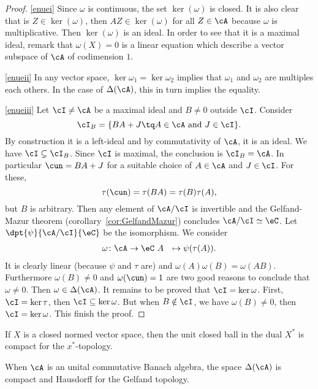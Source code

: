 \begin{proof}
	\ref{enuei} Since $\omega$ is continuous, the set $\ker(\omega)$ is closed. It is also clear that is $Z\in\ker(\omega)$, then $AZ\in\ker(\omega)$ for all $Z\in\cA$ because $\omega$ is multiplicative. Then $\ker(\omega)$ is an ideal. In order to see that it is a maximal ideal, remark that $\omega(X)=0$ is a linear equation which describe a vector subspace of $\cA$ of codimension\label{pg_codimun} $1$.

	\ref{enueii} In any vector space, $\ker{\omega_1}=\ker{\omega_2}$ implies that $\omega_1$ and $\omega_2$ are multiples each others. In the case of $\Delta(\cA)$, this in turn implies the equality.

	\ref{enueiii} Let $\cI\neq\cA$ be a maximal ideal and $B\neq 0$ outside $\cI$. Consider
	\[
		\cI_B=\{BA+J\tq A\in\cA\textrm{ and }J\in\cI\}.
	\]
	By construction it is a left-ideal and by commutativity of $\cA$, it is an ideal. We have $\cI\subsetneq\cI_B$. Since $\cI$ is maximal, the conclusion is $\cI_B=\cA$. In particular $\cun=BA+J$ for a suitable choice of $A\in\cA$ and $J\in\cI$. For these,
	\[
		\tau(\cun)=\tau(BA)=\tau(B)\tau(A),
	\]
	but $B$ is arbitrary. Then any element of $\cA/\cI$ is invertible and the Gelfand-Mazur theorem (corollary~\ref{cor:GelfandMazur}) concludes $\cA/\cI\simeq\eC$. Let $\dpt{\psi}{\cA/\cI}{\eC}$ be the isomorphism. We consider
	\begin{equation}
		\begin{aligned}
			\omega \colon \cA & \to \eC\
			A                 & \mapsto \psi(\tau(A)).
		\end{aligned}
	\end{equation}
	It is clearly linear (because $\psi$ and $\tau$ are) and $\omega(A)\omega(B)=\omega(AB)$. Furthermore $\omega(B)\neq 0$ and $\omega(\cun)=1$ are two good reasons to conclude that $\omega\neq 0$. Then $\omega\in\Delta(\cA)$. It remains to be proved that $\cI=\ker\omega$. First, $\cI=\ker\tau$, then $\cI\subseteq\ker\omega$. But when $B\notin\cI$, we have $\omega(B)\neq 0$, then $\cI=\ker\omega$. This finish the proof.
\end{proof}


\begin{theorem}
	If $X$ is a closed normed vector space, then the unit closed ball in the dual $X^*$ is compact for the $x^*$-topology.
	\label{tho:Banach_Alaoglu}
\end{theorem}

\begin{proposition}
	When $\cA$ is an unital commutative Banach algebra, the space $\Delta(\cA)$ is compact and Hausdorff for the Gelfand topology.
\end{proposition} \label{prop:DcA_comp_Hauss}

